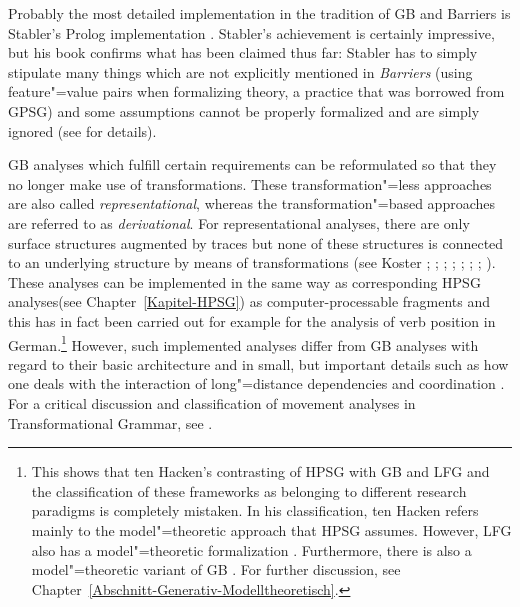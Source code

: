 Probably the most detailed implementation in the tradition of GB and Barriers is Stabler's Prolog implementation
\citeyearpar{Stabler92a-u}. Stabler's achievement is certainly impressive, but his book confirms what has been claimed thus far: Stabler has to simply stipulate many
things which are not explicitly mentioned in \emph{Barriers} (\eg using feature"=value pairs when
formalizing \xbar theory, a practice that was borrowed from GPSG\indexgpsg) and some assumptions
cannot be properly formalized and are simply ignored (see \citealp{Briscoe97a} for details). 

\largerpage
GB analyses\label{Seite-Representationelle-GB} which fulfill certain requirements can be reformulated so that they no longer make use of transformations.
These transformation"=less approaches are also called \emph{representational}, whereas the transformation"=based approaches are referred to as
\emph{derivational}. For representational analyses, there are only surface structures augmented by traces but none of these structures is connected
to an underlying structure by means of transformations (see \eg %
Koster \citeyear[\page ]{Koster78b-u}; \citeyear[]{Koster87a-u}; 
\citealp{KT91a}; \citealp[Section~1.4]{Haider93a}; 
\citealp[]{Frey93a}; \citealp[--88, 177--178]{Lohnstein93a-u}; \citealp[]{FC94a}; \citealp[]{Veenstra98a}).
These analyses can be implemented in the same way as corresponding HPSG analyses\indexhpsg (see
Chapter~\ref{Kapitel-HPSG}) as computer-processable fragments and this has in fact been carried out
for example for the analysis of verb position in German.\footnote{%
	This shows that ten Hacken's contrasting of HPSG with GB and LFG \citep[Section~4.3]{TenHacken2007a}
        and the classification of these frameworks as belonging to different research paradigms is
        completely mistaken. In his classification, ten Hacken refers mainly to the model"=theoretic
        approach that HPSG assumes. However, LFG also has a model"=theoretic formalization
        \citep{Kaplan89b}. Furthermore, there is also a model"=theoretic variant of GB
	\citep{Rogers98a-u}. For further discussion, see Chapter~\ref{Abschnitt-Generativ-Modelltheoretisch}. 
}
However, such implemented analyses differ from GB analyses with regard to their basic architecture and in small, but important details such as how one deals with
the interaction of long"=distance dependencies and coordination \citep{Gazdar81a}. For a critical discussion and classification of movement analyses
in Transformational Grammar, see . 

